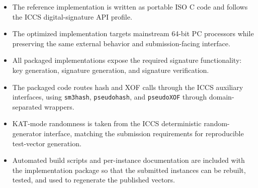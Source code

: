 \begin{itemize}
    \item The reference implementation is written as portable ISO C code and follows the ICCS digital-signature API profile.
    \item The optimized implementation targets mainstream 64-bit PC processors while preserving the same external behavior and submission-facing interface.
    \item All packaged implementations expose the required signature functionality: key generation, signature generation, and signature verification.
    \item The packaged code routes hash and XOF calls through the ICCS auxiliary interfaces, using \texttt{sm3hash}, \texttt{pseudohash}, and \texttt{pseudoXOF} through domain-separated wrappers.
    \item KAT-mode randomness is taken from the ICCS deterministic random-generator interface, matching the submission requirements for reproducible test-vector generation.
    \item Automated build scripts and per-instance documentation are included with the implementation package so that the submitted instances can be rebuilt, tested, and used to regenerate the published vectors.
\end{itemize}
